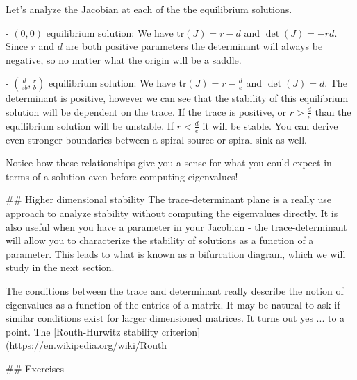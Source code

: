 \documentclass[
]{book}
\theoremstyle{definition}
\theoremstyle{definition}
\theoremstyle{definition}
\theoremstyle{remark}
\begin{document}
Let's analyze the Jacobian at each of the the equilibrium solutions.

- $(0,0)$ equilibrium solution:  We have tr$(J)=r-d$ and $\det(J)=-rd$.  Since $r$ and $d$ are both positive parameters the determinant will always be negative, so no matter what the origin will be a saddle.

- $\displaystyle (\frac{d}{eb}, \frac{r}{b})$ equilibrium solution: We have tr$\displaystyle (J)=r-\frac{d}{e}$ and $\det(J)=d$.  The determinant is positive, however we can see that the stability of this equilibrium solution will be dependent on the trace.  If the trace is positive, or $\displaystyle r > \frac{d}{e}$ than the equilibrium solution will be unstable.  If $\displaystyle r < \frac{d}{e}$ it will be stable.  You can derive even stronger boundaries between a spiral source or spiral sink as well.

Notice how these relationships give you a sense for what you could expect in terms of a solution even before computing eigenvalues!

## Higher dimensional stability
The trace-determinant plane is a really use approach to analyze stability without computing the eigenvalues directly.  It is also useful when you have a parameter in your Jacobian - the trace-determinant will allow you to characterize the stability of solutions as a function of a parameter.  This leads to what is known as a bifurcation diagram, which we will study in the next section.

The conditions between the trace and determinant really describe the notion of eigenvalues as a function of the entries of a matrix.  It may be natural to ask if similar conditions exist for larger dimensioned matrices.  It turns out yes ... to a point.  The [Routh-Hurwitz stability criterion](https://en.wikipedia.org/wiki/Routh%



\newpage
## Exercises
\end{document}
